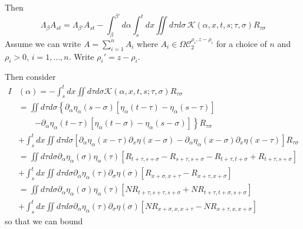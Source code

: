 \documentclass[a4paper,12pt,reqno]{amsproc}
\newcommand{\NN}{N}
\newcommand{\OCC}{\Omega \mathcal{C}}
\begin{document}
Then 
\begin{equation}
\label{eq:telescope}
  \Lambda_\beta A_{st} = \Lambda_{\beta'} A_{st}
- \int_\beta^{\beta'} d\alpha \int_s^t dx
 \iint d\tau d\sigma \,\mathcal{K}(\alpha,x,t,s;\tau,\sigma) R_{\tau \sigma}   
\end{equation}
Assume we can write $A = \sum_{i=1}^n A_i$ where $A_i \in
\OCC_2^{\rho_i,z-\rho_i}$ for a choice of $n$ and $\rho_i > 0$,
$i=1,\dots,n$. Write $\rho_i' = z-\rho_i$.

Then consider
\begin{equation*}
  \begin{split}
 I&(\alpha)  =
 - \int_s^t dx \iint d\tau d\sigma
 \mathcal{K}(\alpha,x,t,s;\tau,\sigma) R_{\tau \sigma} 
\\ & =
  \iint d\tau d\sigma \left\{\partial_\alpha \eta_\alpha(s-\sigma)
 [\eta_\alpha(t-\tau)-\eta_\alpha(s-\tau)] \right.\\ & \qquad \left. -
 \partial_\alpha \eta_\alpha(t-\tau)
 [\eta_\alpha(t-\sigma)-\eta_\alpha(s-\sigma)]\right\} R_{\tau \sigma} 
\\ & 
 + \int_s^t dx \iint d\tau d\sigma
[\partial_\alpha \eta_\alpha(x-\tau) \partial_x \eta(x-\sigma) -
 \partial_\alpha \eta_\alpha(x-\sigma) \partial_x \eta(x-\tau)]
 R_{\tau \sigma}
\\ & = 
  \iint d\tau d\sigma \partial_\alpha \eta_\alpha(\sigma)
 \eta_\alpha(\tau) [R_{t+\tau,s+\sigma }-R_{s+\tau,s+\sigma }-R_{t+\tau,t+\sigma}+R_{t+\tau,s+\sigma} ]
\\ & 
 + \int_s^t dx \iint d\tau d\sigma
\partial_\alpha \eta_\alpha(\tau) \partial_\sigma \eta(\sigma) 
 [R_{x+\sigma,x+\tau}-R_{x+\tau,x+\sigma}]
\\ & = 
  \iint d\tau d\sigma \partial_\alpha \eta_\alpha(\sigma)
 \eta_\alpha(\tau) [\NN R_{t+\tau,s+\tau,s+\sigma }+\NN R_{t+\tau,t+\sigma,s+\sigma} ]
\\ & 
 + \int_s^t dx \iint d\tau d\sigma
\partial_\alpha \eta_\alpha(\tau) \partial_\sigma \eta(\sigma) 
 [\NN R_{x+\sigma,x,x+\tau}-\NN R_{x+\tau,x,x+\sigma}]
  \end{split}
\end{equation*}
so that we can bound
\end{document}
